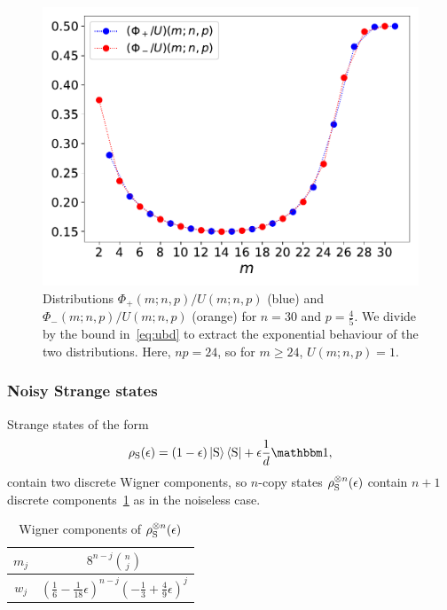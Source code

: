 \documentclass[pra,
aps,
twocolumn,
superscriptaddress,
groupedaddress,
nofootinbib,
reprint
]{revtex4-1}
\begin{document}
\begin{figure}
    \centering
    \includegraphics[scale=0.5]{figs/Phi_nexp.pdf}
    \caption{Distributions $\Phi_+(m;n,p)/U(m;n,p)$ (blue) and $\Phi_-(m;n,p)/U(m;n,p)$ (orange) for $n=30$ and $p=\frac{4}{5}$.
    We divide by the bound in~\cref{eq:ubd} to extract the exponential behaviour of the two distributions.
    Here, $np = 24$, so for $m\geq 24$, $U(m;n,p) = 1$.
    }
    \label{fig:phinexp}
\end{figure}

\subsubsection{Noisy Strange states}

Strange states of the form 
\begin{equation}
    \rho_{\rm{S}}(\epsilon) = (1 - \epsilon) \ket{\rm{S}}\bra{\rm{S}} + \epsilon \frac{1}{d}\id,
\end{equation}
contain two discrete Wigner components, so $n$-copy states $\rho_{\rm{S}}^{\otimes n}(\epsilon)$ contain $n+1$ discrete components~\cref{tab:swc} as in the noiseless case.
\begin{table}[h]                           
 \centering
 \begin{tabular}{|c|c|}
 \hline
 $m_j$ & $8^{n-j}\binom{n}{j}$ \\ [0.5ex] 
 \hline\hline
 $w_j$ & $\left(\frac{1}{6} - \frac{1}{18}\epsilon \right)^{n-j}\left(-\frac{1}{3} + \frac{4}{9}\epsilon \right)^{j}$ \\
 \hline
\end{tabular}
 \caption{Wigner components of $\rho_{\rm{S}}^{\otimes n}(\epsilon)$}
 \label{tab:swc}
\end{table}
\end{document}
